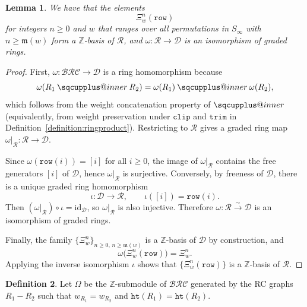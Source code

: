 \documentclass{amsart}
\makeatletter
\newcommand{\sqcupplus@inner}[2]{%
  \vcenter{\hbox{\ooalign{%
    \hfil$\m@th#1\sqcup$\hfil\cr
    \hfil\raisebox{0.15ex}{$\m@th#1\scriptscriptstyle+$}\hfil\cr
  }}}%
}
\newcommand{\sqcupplus}{\mathbin{\mathpalette\sqcupplus@inner\relax}}
\newtheorem{lemma}{Lemma}[subsection]
\theoremstyle{definition}
\newtheorem{definition}[lemma]{Definition}
\theoremstyle{remark}
\numberwithin{equation}{subsection}
\newcommand{\wof}[1]{w_{#1}}
\newcommand{\trm}{\mathtt{trim}}
\newcommand{\hr}{\mathtt{ht}}
\newcommand{\clp}{\mathtt{clip}}
\newcommand{\BRC}{\mathcal{BRC}}
\newcommand{\dsch}{\ensuremath{\Xi}}
\newcommand{\dcoma}{\mathcal{D}}
\newcommand{\maxd}{\mathfrak{m}}
\makeatother
\begin{document}
\begin{lemma} \label{lemma:schubertrow}
We have that the elements
$$\dsch_w^n(\mathtt{row})$$
for integers $n\geq 0$ and $w$ that ranges over all permutations in $S_\infty$ with $n\geq \maxd(w)$ form a $\mathbb{Z}$-basis of $\mathcal{R}$, and $\omega:\mathcal{R}\to \dcoma$ is an isomorphism of graded rings.
\end{lemma}
\begin{proof}
First, $\omega:\BRC\to\dcoma$ is a ring homomorphism because
$$
\omega(R_1\sqcupplus R_2)=\omega(R_1)\sqcupplus\omega(R_2),
$$
which follows from the weight concatenation property of $\sqcupplus$ (equivalently, from weight preservation under $\clp$ and $\trm$ in Definition~\ref{definition:ringproduct}). Restricting to $\mathcal{R}$ gives a graded ring map $\omega|_{\mathcal{R}}:\mathcal{R}\to\dcoma$.

Since $\omega(\mathtt{row}(i))=[i]$ for all $i\ge 0$, the image of $\omega|_{\mathcal{R}}$ contains the free generators $[i]$ of $\dcoma$, hence $\omega|_{\mathcal{R}}$ is surjective. Conversely, by freeness of $\dcoma$, there is a unique graded ring homomorphism
$$
\iota:\dcoma\to\mathcal{R},\qquad \iota([i])=\mathtt{row}(i).
$$
Then $(\omega|_{\mathcal{R}})\circ\iota=\mathrm{id}_{\dcoma}$, so $\omega|_{\mathcal{R}}$ is also injective. Therefore $\omega:\mathcal{R}\xrightarrow{\sim}\dcoma$ is an isomorphism of graded rings.

Finally, the family $\{\dsch_w^n\}_{n\ge 0,\, n\ge\maxd(w)}$ is a $\mathbb{Z}$-basis of $\dcoma$ by construction, and
$$
\omega\bigl(\dsch_w^n(\mathtt{row})\bigr)=\dsch_w^n.
$$
Applying the inverse isomorphism $\iota$ shows that $\{\dsch_w^n(\mathtt{row})\}$ is a $\mathbb{Z}$-basis of $\mathcal{R}$.
\end{proof}

\begin{definition}\label{definition:omega}
Let $\Omega$ be the $\mathbb{Z}$-submodule of $\BRC$ generated by the RC graphs $R_1-R_2$ such that $\wof{R_1}=\wof{R_2}$ and $\hr(R_1)=\hr(R_2)$.
\end{definition}
\end{document}
